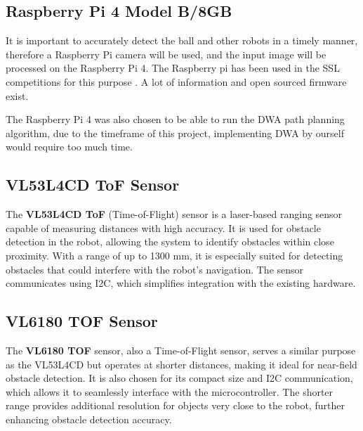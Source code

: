 \documentclass[a4paper,8pt]{article}
\begin{document}
\subsection{Raspberry Pi 4 Model B/8GB}

It is important to accurately detect the ball and other robots in a
timely manner, therefore a Raspberry Pi camera will be used, and the input image
will be processed on the Raspberry Pi 4. The Raspberry pi has
been used in the SSL competitions for this purpose
\cite{ommerExtendedTeamDescription}\cite{satoGreenTea2024Team}. A lot of information and open sourced firmware exist.

The Raspberry Pi 4 was also chosen to be able to run the DWA path
planning algorithm, due to the timeframe of this project, implementing
DWA by ourself would require too much time.

%
%

\subsection{VL53L4CD ToF Sensor}

The \textbf{VL53L4CD ToF} (Time-of-Flight) sensor is a laser-based ranging sensor capable of measuring distances with high accuracy. It is used for obstacle detection in the robot, allowing the system to identify obstacles within close proximity. With a range of up to 1300 mm, it is especially suited for detecting obstacles that could interfere with the robot's navigation. The sensor communicates using I2C, which simplifies integration with the existing hardware.

\subsection{VL6180 TOF Sensor}

The \textbf{VL6180 TOF} sensor, also a Time-of-Flight sensor, serves a similar purpose as the VL53L4CD but operates at shorter distances, making it ideal for near-field obstacle detection. It is also chosen for its compact size and I2C communication, which allows it to seamlessly interface with the microcontroller. The shorter range provides additional resolution for objects very close to the robot, further enhancing obstacle detection accuracy.
\end{document}
